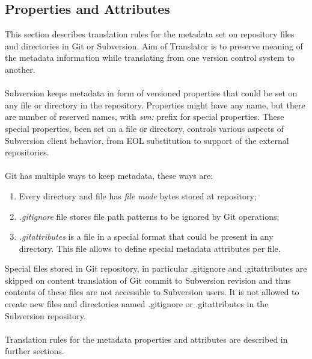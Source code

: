 \subsection{Properties and Attributes}
\label{section_properties_and_attributes}
This section describes translation rules for the metadata set on repository files and directories in Git or Subversion.
Aim of Translator is to preserve meaning of the metadata information while translating from one version control system
to another.
\\\\
Subversion keeps metadata in form of versioned properties that could be set on any file or directory in the repository.
Properties might have any name, but there are number of reserved names, with \emph{svn:} prefix for special properties. 
These special properties, been set on a file or directory, controls various aspects of Subversion client behavior, 
from EOL substitution to support of the external repositories.
\\\\
Git has multiple ways to keep metadata, these ways are:
\begin{enumerate}
\compactlist
\item Every directory and file has \emph{file mode} bytes stored at repository;
\item \emph{.gitignore} file stores file path patterns to be ignored by Git operations;
\item \emph{.gitattributes} is a file in a special format that could be present in any directory.
This file allows to define special metadata attributes per file.
\end{enumerate}

Special files stored in Git repository, in particular .gitignore and .gitattributes are skipped
on content translation of Git commit to Subversion revision and thus contents of these files are not 
accessible to Subversion users. It is not allowed to create new files and directories named
.gitignore or .gitattributes in the Subversion repository.
\\\\
Translation rules for the metadata properties and attributes are described in further sections.

